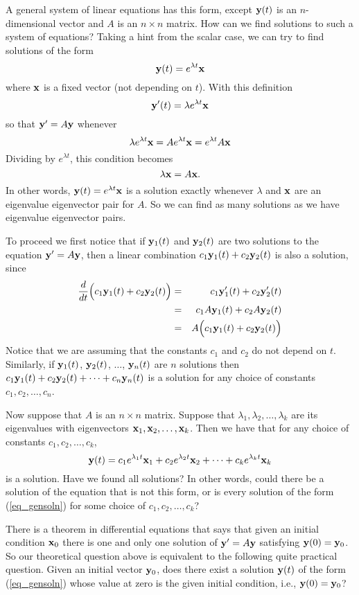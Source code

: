A general system of linear equations has this form, except ${\bf y}(t)$ is
an $n$-dimensional vector and $A$ is an $n\times n$ matrix.  How can
we find solutions to such a system of equations? Taking a hint from
the scalar case, we can try to find solutions of the form
\[
{\bf y}(t) = e^{\lambda t}{\bf x}
\]
where ${\bf x}$ is a fixed vector (not depending on $t$). With this definition
\[
{\bf y}'(t) = \lambda e^{\lambda t}{\bf x}
\]
so that ${\bf y}'=A{\bf y}$ whenever
\[
\lambda e^{\lambda t}{\bf x} = A e^{\lambda t}{\bf x} =  e^{\lambda t}A{\bf x}
\]
Dividing by $e^{\lambda t}$, this condition becomes
\[
\lambda{\bf x} = A{\bf x}.
\]
In other words, ${\bf y}(t) = e^{\lambda t}{\bf x}$ is a solution exactly
whenever $\lambda$ and ${\bf x}$ are an eigenvalue eigenvector pair for
$A$.  So we can find as many solutions as we have eigenvalue
eigenvector pairs.

To proceed we first notice that if ${\bf y}_1(t)$ and ${\bf y}_2(t)$ are two
solutions to the equation ${\bf y}'=A{\bf y}$, then a linear combination
$c_1{\bf y}_1(t)+c_2{\bf y}_2(t)$ is also a solution, since
\begin{eqnarray*}
{{d}\over{dt}}\Big(c_1{\bf y}_1(t)+c_2{\bf y}_2(t)\Big)
&=&c_1{\bf y}_1'(t)+c_2{\bf y}_2'(t) \\
&=&c_1A{\bf y}_1(t)+c_2A{\bf y}_2(t) \\
&=&A\Big(c_1{\bf y}_1(t)+c_2{\bf y}_2(t)\Big) 
\end{eqnarray*}
Notice that we are assuming that the constants $c_1$ and $c_2$ do not
depend on $t$.  Similarly, if ${\bf y}_1(t)$, ${\bf y}_2(t)$, $\ldots$,
${\bf y}_n(t)$ are $n$ solutions then $c_1{\bf y}_1(t)+c_2{\bf y}_2(t)+\cdots
+c_n{\bf y}_n(t)$ is a solution for any choice of constants
$c_1,c_2,\ldots, c_n$.

Now suppose that $A$ is an $n\times n$ matrix. Suppose that
$\lambda_1,\lambda_2,\ldots,\lambda_k$ are its eigenvalues with
eigenvectors ${\bf x}_1, {\bf x}_2, \ldots, {\bf x}_k$. Then we have that for any
choice of constants $c_1, c_2, \ldots, c_k$,
\begin{equation}
\label{eq_gensoln}
{\bf y}(t) = c_1e^{\lambda_1 t}{\bf x}_1 +  c_2e^{\lambda_2 t}{\bf x}_2
+\cdots + c_ke^{\lambda_k t}{\bf x}_k
\end{equation}
is a solution.  Have we found all solutions? In other words, could
there be a solution of the equation that is not this form, or is every
solution of the form (\ref{eq_gensoln}) for some choice of $c_1, c_2,
\ldots, c_k$?

There is a theorem in differential equations that says that given an
initial condition ${\bf x}_0$ there is one and only one solution of
${\bf y}' = A{\bf y}$ satisfying ${\bf y}(0)={\bf y}_0$.  So our theoretical question
above is equivalent to the following quite practical question. Given
an initial vector ${\bf y}_0$, does there exist a solution ${\bf y}(t)$ of the
form (\ref{eq_gensoln}) whose value at zero is the given initial condition,
i.e., ${\bf y}(0)={\bf y}_0$?

